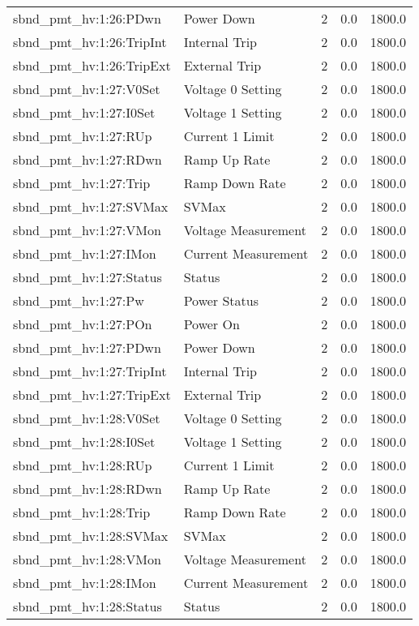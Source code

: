 \begin{center}
\begin{longtable}{l | l l l l }
sbnd\_pmt\_hv:1:26:PDwn & Power Down & 2 & 0.0 & 1800.0\\ 
sbnd\_pmt\_hv:1:26:TripInt & Internal Trip & 2 & 0.0 & 1800.0\\ 
sbnd\_pmt\_hv:1:26:TripExt & External Trip & 2 & 0.0 & 1800.0\\ 
sbnd\_pmt\_hv:1:27:V0Set & Voltage 0 Setting & 2 & 0.0 & 1800.0\\ 
sbnd\_pmt\_hv:1:27:I0Set & Voltage 1 Setting & 2 & 0.0 & 1800.0\\ 
sbnd\_pmt\_hv:1:27:RUp & Current 1 Limit & 2 & 0.0 & 1800.0\\ 
sbnd\_pmt\_hv:1:27:RDwn & Ramp Up Rate & 2 & 0.0 & 1800.0\\ 
sbnd\_pmt\_hv:1:27:Trip & Ramp Down Rate & 2 & 0.0 & 1800.0\\ 
sbnd\_pmt\_hv:1:27:SVMax & SVMax & 2 & 0.0 & 1800.0\\ 
sbnd\_pmt\_hv:1:27:VMon & Voltage Measurement & 2 & 0.0 & 1800.0\\ 
sbnd\_pmt\_hv:1:27:IMon & Current Measurement & 2 & 0.0 & 1800.0\\ 
sbnd\_pmt\_hv:1:27:Status & Status & 2 & 0.0 & 1800.0\\ 
sbnd\_pmt\_hv:1:27:Pw & Power Status & 2 & 0.0 & 1800.0\\ 
sbnd\_pmt\_hv:1:27:POn & Power On & 2 & 0.0 & 1800.0\\ 
sbnd\_pmt\_hv:1:27:PDwn & Power Down & 2 & 0.0 & 1800.0\\ 
sbnd\_pmt\_hv:1:27:TripInt & Internal Trip & 2 & 0.0 & 1800.0\\ 
sbnd\_pmt\_hv:1:27:TripExt & External Trip & 2 & 0.0 & 1800.0\\ 
sbnd\_pmt\_hv:1:28:V0Set & Voltage 0 Setting & 2 & 0.0 & 1800.0\\ 
sbnd\_pmt\_hv:1:28:I0Set & Voltage 1 Setting & 2 & 0.0 & 1800.0\\ 
sbnd\_pmt\_hv:1:28:RUp & Current 1 Limit & 2 & 0.0 & 1800.0\\ 
sbnd\_pmt\_hv:1:28:RDwn & Ramp Up Rate & 2 & 0.0 & 1800.0\\ 
sbnd\_pmt\_hv:1:28:Trip & Ramp Down Rate & 2 & 0.0 & 1800.0\\ 
sbnd\_pmt\_hv:1:28:SVMax & SVMax & 2 & 0.0 & 1800.0\\ 
sbnd\_pmt\_hv:1:28:VMon & Voltage Measurement & 2 & 0.0 & 1800.0\\ 
sbnd\_pmt\_hv:1:28:IMon & Current Measurement & 2 & 0.0 & 1800.0\\ 
sbnd\_pmt\_hv:1:28:Status & Status & 2 & 0.0 & 1800.0\\ 

\end{longtable}
\end{center}
